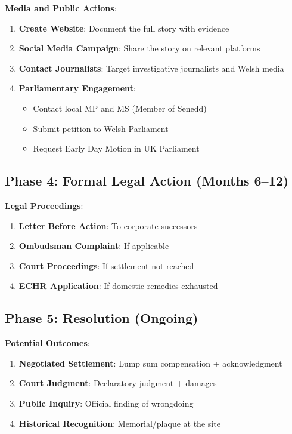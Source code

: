 \documentclass[11pt,a4paper]{article}
\begin{document}
\begin{action}
\textbf{Media and Public Actions}:
\begin{enumerate}[label=\arabic*.]
    \item \textbf{Create Website}: Document the full story with evidence
    \item \textbf{Social Media Campaign}: Share the story on relevant platforms
    \item \textbf{Contact Journalists}: Target investigative journalists and Welsh media
    \item \textbf{Parliamentary Engagement}:
    \begin{itemize}
        \item Contact local MP and MS (Member of Senedd)
        \item Submit petition to Welsh Parliament
        \item Request Early Day Motion in UK Parliament
    \end{itemize}
\end{enumerate}
\end{action}

\subsection{Phase 4: Formal Legal Action (Months 6--12)}

\begin{action}
\textbf{Legal Proceedings}:
\begin{enumerate}[label=\arabic*.]
    \item \textbf{Letter Before Action}: To corporate successors
    \item \textbf{Ombudsman Complaint}: If applicable
    \item \textbf{Court Proceedings}: If settlement not reached
    \item \textbf{ECHR Application}: If domestic remedies exhausted
\end{enumerate}
\end{action}

\subsection{Phase 5: Resolution (Ongoing)}

\begin{action}
\textbf{Potential Outcomes}:
\begin{enumerate}[label=\arabic*.]
    \item \textbf{Negotiated Settlement}: Lump sum compensation + acknowledgment
    \item \textbf{Court Judgment}: Declaratory judgment + damages
    \item \textbf{Public Inquiry}: Official finding of wrongdoing
    \item \textbf{Historical Recognition}: Memorial/plaque at the site
\end{enumerate}
\end{action}
\end{document}
